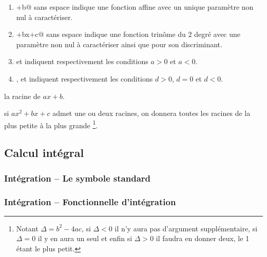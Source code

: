 \documentclass[12pt,a4paper]{article}
\theoremstyle{definition}
\newcommand\extraspace{
	\vspace{0.25em}
}
\begin{document}
\begin{enumerate}
	\item \verb@ax+b@ sans espace indique une fonction affine avec un unique paramètre \verb@a@ non nul à caractériser.

	\item {}+bx+c@ sans espace indique une fonction trinôme du 2\ieme{} degré avec une paramètre \verb@a@ non nul à caractériser ainsi que \verb@d@ pour son discriminant.


	\smallskip
	
	\item \verb@ap@ et \verb@an@ indiquent respectivement les conditions $a > 0$ et $a < 0$.

	\item \verb@dp@, \verb@dz@ et \verb@dn@ indiquent respectivement les conditions $d > 0$, $d = 0$ et $d < 0$.
\end{enumerate}


 la racine de $ax + b$.


 si $ax^2 + bx + c$ admet une ou deux racines, on donnera toutes les racines de la plus petite à la plus grande
\footnote{
	Notant $\Delta = b^2 - 4 ac$, si $\Delta < 0$ il n'y aura pas d'argument supplémentaire, si $\Delta = 0$ il y en aura un seul et enfin si $\Delta > 0$ il faudra en donner deux, le 1\ier{} étant le plus petit.
}.
\subsection{Calcul intégral}

\subsubsection{Intégration -- Le symbole standard}






\subsubsection{Intégration -- Fonctionnelle d'intégration}



\extraspace
\end{document}
